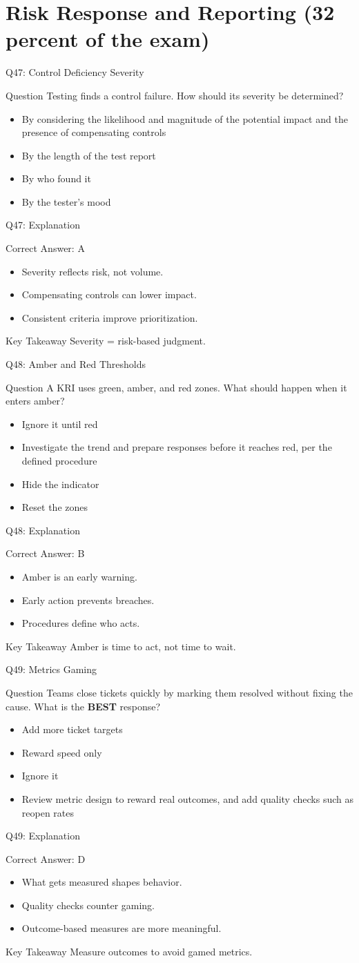 \documentclass[aspectratio=169]{beamer}
\newcommand{\hq}[7]{%
	\begin{frame}{Q#1: #2}
		\begin{block}{Question}
			#3
		\end{block}
		\begin{itemize}
			#4
		\end{itemize}
	\end{frame}
	\begin{frame}{Q#1: Explanation}
		\begin{block}{Correct Answer: #5}
			\begin{itemize}
				#6
			\end{itemize}
		\end{block}
		\begin{alertblock}{Key Takeaway}
			#7
		\end{alertblock}
	\end{frame}
}
\begin{document}
	\section{Risk Response and Reporting (32 percent of the exam)}

	\hq{47}{Control Deficiency Severity}
	{Testing finds a control failure. How should its severity be determined?}
	{\item[\textbf{(A)}] By considering the likelihood and magnitude of the potential impact and the presence of compensating controls
		\item[\textbf{(B)}] By the length of the test report
		\item[\textbf{(C)}] By who found it
		\item[\textbf{(D)}] By the tester's mood}
	{A}
	{\item Severity reflects risk, not volume.
		\item Compensating controls can lower impact.
		\item Consistent criteria improve prioritization.}
	{Severity = risk-based judgment.}

	\hq{48}{Amber and Red Thresholds}
	{A KRI uses green, amber, and red zones. What should happen when it enters amber?}
	{\item[\textbf{(A)}] Ignore it until red
		\item[\textbf{(B)}] Investigate the trend and prepare responses before it reaches red, per the defined procedure
		\item[\textbf{(C)}] Hide the indicator
		\item[\textbf{(D)}] Reset the zones}
	{B}
	{\item Amber is an early warning.
		\item Early action prevents breaches.
		\item Procedures define who acts.}
	{Amber is time to act, not time to wait.}

	\hq{49}{Metrics Gaming}
	{Teams close tickets quickly by marking them resolved without fixing the cause. What is the \textbf{BEST} response?}
	{\item[\textbf{(A)}] Add more ticket targets
		\item[\textbf{(B)}] Reward speed only
		\item[\textbf{(C)}] Ignore it
		\item[\textbf{(D)}] Review metric design to reward real outcomes, and add quality checks such as reopen rates}
	{D}
	{\item What gets measured shapes behavior.
		\item Quality checks counter gaming.
		\item Outcome-based measures are more meaningful.}
	{Measure outcomes to avoid gamed metrics.}
\end{document}
